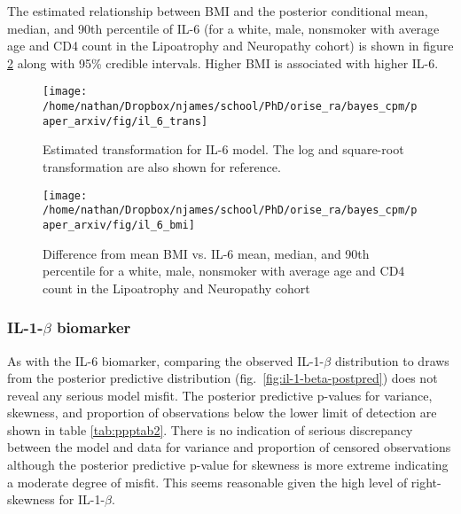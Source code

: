 \documentclass[
]{article}
\begin{document}
The estimated relationship between BMI and the posterior conditional mean, median, and 90th percentile of IL-6 (for a white, male, nonsmoker with average age and CD4 count in the Lipoatrophy and Neuropathy cohort) is shown in figure \ref{fig:il6-bmi} along with 95\% credible intervals. Higher BMI is associated with higher IL-6.

\begin{figure}

{\centering \texttt{[image: /home/nathan/Dropbox/njames/school/PhD/orise\_ra/bayes\_cpm/paper\_arxiv/fig/il\_6\_trans]} 

}

\caption{Estimated transformation for IL-6 model. The log and square-root transformation are also shown for reference.}\label{fig:il-6-trans-1}
\end{figure}

\begin{figure}

{\centering \texttt{[image: /home/nathan/Dropbox/njames/school/PhD/orise\_ra/bayes\_cpm/paper\_arxiv/fig/il\_6\_bmi]} 

}

\caption{Difference from mean BMI vs. IL-6 mean, median, and 90th percentile for a white, male, nonsmoker with average age and CD4 count in the Lipoatrophy and Neuropathy cohort}\label{fig:il6-bmi}
\end{figure}

\hypertarget{il-1-beta-biomarker}{%
\subsubsection{\texorpdfstring{IL-1-\(\beta\) biomarker}{IL-1-\textbackslash beta biomarker}}\label{il-1-beta-biomarker}}

As with the IL-6 biomarker, comparing the observed IL-1-\(\beta\) distribution to draws from the posterior predictive distribution (fig.~\ref{fig:il-1-beta-postpred}) does not reveal any serious model misfit. The posterior predictive p-values for variance, skewness, and proportion of observations below the lower limit of detection are shown in table \ref{tab:ppptab2}. There is no indication of serious discrepancy between the model and data for variance and proportion of censored observations although the posterior predictive p-value for skewness is more extreme indicating a moderate degree of misfit. This seems reasonable given the high level of right-skewness for IL-1-\(\beta\).
\end{document}
